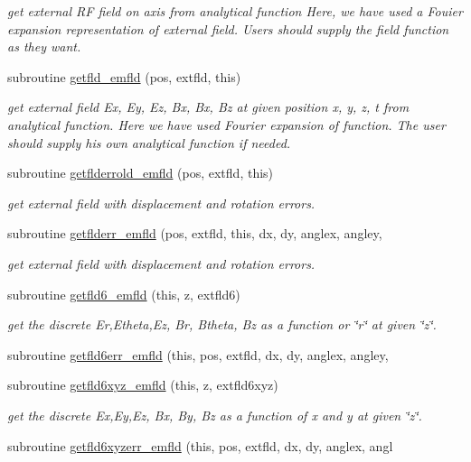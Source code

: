 \begin{DoxyCompactItemize}
\begin{DoxyCompactList}\small\item\em get external RF field on axis from analytical function Here, we have used a Fouier expansion representation of external field. Users should supply the field function as they want. \end{DoxyCompactList}\item 
subroutine \mbox{\hyperlink{namespaceemfldclass_aa0023b4b2c7a17c75becc20eeb9be23c}{getfld\+\_\+emfld}} (pos, extfld, this)
\begin{DoxyCompactList}\small\item\em get external field Ex, Ey, Ez, Bx, Bx, Bz at given position x, y, z, t from analytical function. Here we have used Fourier expansion of function. The user should supply his own analytical function if needed. \end{DoxyCompactList}\item 
subroutine \mbox{\hyperlink{namespaceemfldclass_a828e010a02ef4b8d9806f8d4c3053126}{getflderrold\+\_\+emfld}} (pos, extfld, this)
\begin{DoxyCompactList}\small\item\em get external field with displacement and rotation errors. \end{DoxyCompactList}\item 
subroutine \mbox{\hyperlink{namespaceemfldclass_ad7628b9fdaf5e839e55f71c3f8678c11}{getflderr\+\_\+emfld}} (pos, extfld, this, dx, dy, anglex, angley,
\begin{DoxyCompactList}\small\item\em get external field with displacement and rotation errors. \end{DoxyCompactList}\item 
subroutine \mbox{\hyperlink{namespaceemfldclass_a7eb67a0a1ce6ea3f37b4c55e40048f4a}{getfld6\+\_\+emfld}} (this, z, extfld6)
\begin{DoxyCompactList}\small\item\em get the discrete Er,Etheta,Ez, Br, Btheta, Bz as a function or \char`\"{}r\char`\"{} at given \char`\"{}z\char`\"{}. \end{DoxyCompactList}\item 
subroutine \mbox{\hyperlink{namespaceemfldclass_ab5c872006557986fafd6080666ca68f1}{getfld6err\+\_\+emfld}} (this, pos, extfld, dx, dy, anglex, angley,
\item 
subroutine \mbox{\hyperlink{namespaceemfldclass_a6a4833c66a8430fe7d7c3e005dd34c6e}{getfld6xyz\+\_\+emfld}} (this, z, extfld6xyz)
\begin{DoxyCompactList}\small\item\em get the discrete Ex,Ey,Ez, Bx, By, Bz as a function of x and y at given \char`\"{}z\char`\"{}. \end{DoxyCompactList}\item 
subroutine \mbox{\hyperlink{namespaceemfldclass_a53a2dd6514711afd20442dab5686c5a4}{getfld6xyzerr\+\_\+emfld}} (this, pos, extfld, dx, dy, anglex, angl
\end{DoxyCompactItemize}
